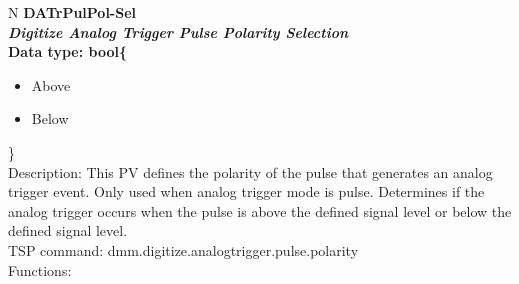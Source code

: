 \documentclass[openany]{article}
\begin{document}
		\begin{tabular}{N}
			\hline
			\bfseries DATrPulPol-Sel\label{pv:datrpulpol-sel} \\ \hline
			\emph{Digitize Analog Trigger Pulse Polarity Selection} \\
			Data type: bool\{\begin{itemize}[noitemsep]
				\small
				\item[] Above
				\item[] Below
			\end{itemize}\} \\
			Description: This PV defines the polarity of the pulse that generates an analog trigger event. Only used when analog trigger mode is pulse. Determines if the analog trigger occurs when the pulse is above the defined signal level or below the defined signal level. \\
			TSP command: dmm.digitize.analogtrigger.pulse.polarity \\
			Functions: \\
			\arrayrulecolor{\FuncTableBorderColor}

		\end{tabular}
\end{document}
